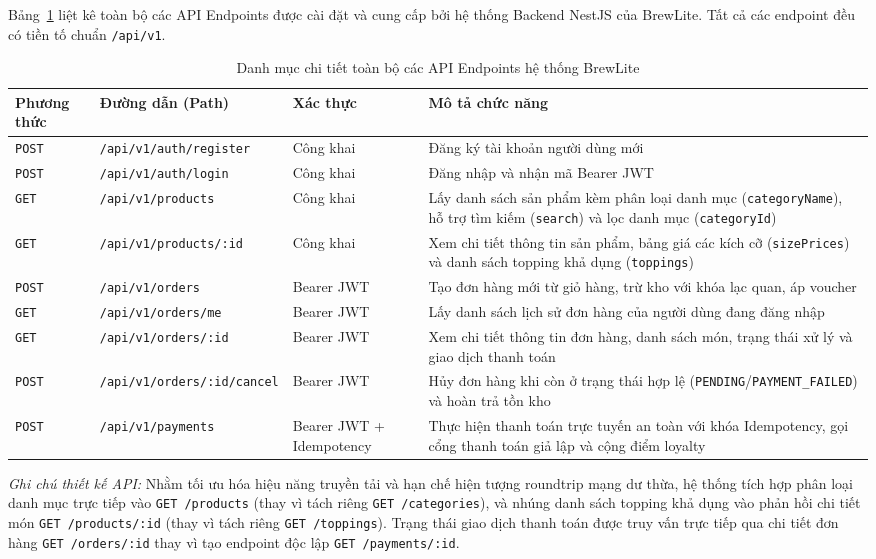 \documentclass[12pt,a4paper,oneside]{report}
\begin{document}
Bảng~\ref{tab:full-api-list} liệt kê toàn bộ các API Endpoints được cài đặt và cung cấp bởi hệ thống Backend NestJS của BrewLite. Tất cả các endpoint đều có tiền tố chuẩn \texttt{/api/v1}.

\begin{table}[H]
\centering
\small
\caption{Danh mục chi tiết toàn bộ các API Endpoints hệ thống BrewLite}
\label{tab:full-api-list}
\begin{tabularx}{\textwidth}{llp{2.5cm}X}
\toprule
\textbf{Phương thức} & \textbf{Đường dẫn (Path)} & \textbf{Xác thực} & \textbf{Mô tả chức năng} \\
\midrule
\texttt{POST} & \texttt{/api/v1/auth/register} & Công khai & Đăng ký tài khoản người dùng mới \\
\texttt{POST} & \texttt{/api/v1/auth/login} & Công khai & Đăng nhập và nhận mã Bearer JWT \\
\midrule
\texttt{GET} & \texttt{/api/v1/products} & Công khai & Lấy danh sách sản phẩm kèm phân loại danh mục (\texttt{categoryName}), hỗ trợ tìm kiếm (\texttt{search}) và lọc danh mục (\texttt{categoryId}) \\
\texttt{GET} & \texttt{/api/v1/products/:id} & Công khai & Xem chi tiết thông tin sản phẩm, bảng giá các kích cỡ (\texttt{sizePrices}) và danh sách topping khả dụng (\texttt{toppings}) \\
\midrule
\texttt{POST} & \texttt{/api/v1/orders} & Bearer JWT & Tạo đơn hàng mới từ giỏ hàng, trừ kho với khóa lạc quan, áp voucher \\
\texttt{GET} & \texttt{/api/v1/orders/me} & Bearer JWT & Lấy danh sách lịch sử đơn hàng của người dùng đang đăng nhập \\
\texttt{GET} & \texttt{/api/v1/orders/:id} & Bearer JWT & Xem chi tiết thông tin đơn hàng, danh sách món, trạng thái xử lý và giao dịch thanh toán \\
\texttt{POST} & \texttt{/api/v1/orders/:id/cancel} & Bearer JWT & Hủy đơn hàng khi còn ở trạng thái hợp lệ (\texttt{PENDING}/\allowbreak\texttt{PAYMENT\_\allowbreak FAILED}) và hoàn trả tồn kho \\
\midrule
\texttt{POST} & \texttt{/api/v1/payments} & Bearer JWT + Idempotency & Thực hiện thanh toán trực tuyến an toàn với khóa Idempotency, gọi cổng thanh toán giả lập và cộng điểm loyalty \\
\bottomrule
\end{tabularx}
\end{table}

\noindent\textit{Ghi chú thiết kế API:} Nhằm tối ưu hóa hiệu năng truyền tải và hạn chế hiện tượng roundtrip mạng dư thừa, hệ thống tích hợp phân loại danh mục trực tiếp vào \texttt{GET /products} (thay vì tách riêng \texttt{GET /categories}), và nhúng danh sách topping khả dụng vào phản hồi chi tiết món \texttt{GET /products/:id} (thay vì tách riêng \texttt{GET /toppings}). Trạng thái giao dịch thanh toán được truy vấn trực tiếp qua chi tiết đơn hàng \texttt{GET /orders/:id} thay vì tạo endpoint độc lập \texttt{GET /payments/:id}.
\end{document}
